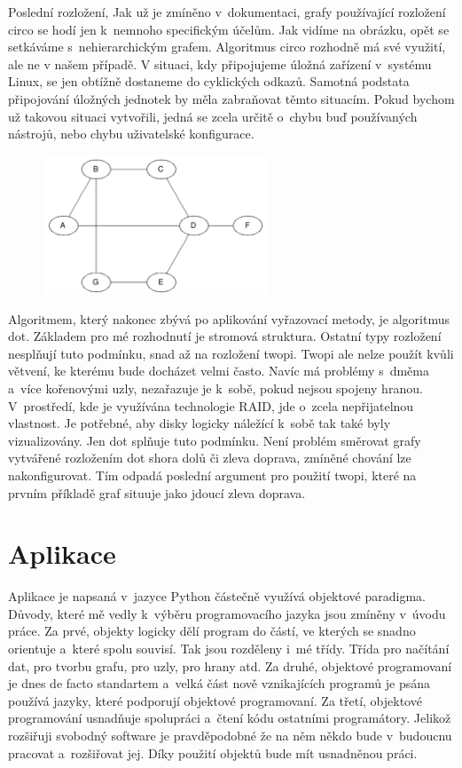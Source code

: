 \documentclass[color,table,oneside,nolot,nolof]{fithesis}
\begin{document}
	Poslední rozložení, \cite{graphviz_layout} 
	Jak už je zmíněno v~dokumentaci, grafy používající rozložení 
	circo se hodí jen k~nemnoho specifickým účelům. Jak vidíme na obrázku, opět se setkáváme s~nehierarchickým grafem. Algoritmus circo rozhodně má své využití, ale ne v našem případě. V
	situaci, kdy připojujeme úložná zařízení v~systému Linux, se jen obtížně dostaneme do cyklických odkazů. Samotná podstata připojování úložných jednotek by měla zabraňovat těmto
	situacím. Pokud bychom už takovou situaci vytvořili, jedná se zcela určitě o~chybu buď používaných nástrojů, nebo chybu uživatelské konfigurace. 
\begin{figure}
	\centering
	\includegraphics[width=0.6\textwidth]{pictures/circo_example.png} 
\end{figure}

	Algoritmem, který nakonec zbývá po aplikování vyřazovací metody, je algoritmus dot. 
	Základem pro mé rozhodnutí je stromová struktura. Ostatní typy rozložení nesplňují tuto podmínku, snad až na rozložení twopi. Twopi ale nelze použít kvůli větvení,
	ke kterému bude docházet velmi často. Navíc má problémy s~dměma a~více kořenovými uzly, nezařazuje je k~sobě, pokud nejsou spojeny hranou. V~prostředí, kde je využívána technologie
	RAID, jde o~zcela nepřijatelnou vlastnost. Je potřebné, aby disky logicky náležící k~sobě tak také byly vizualizovány. Jen dot splňuje tuto podmínku. Není problém směrovat grafy 
	vytvářené rozložením dot shora dolů či zleva doprava, zmíněné chování lze nakonfigurovat. Tím odpadá poslední argument pro použití twopi, které na prvním příkladě graf situuje jako
	jdoucí zleva doprava.

\chapter{Aplikace}
	Aplikace je napsaná v~jazyce Python částečně využívá objektové paradigma. Důvody, které mě vedly k~výběru programovacího jazyka jsou zmíněny v~úvodu práce. Za prvé, objekty logicky
	dělí program do částí, ve kterých se snadno orientuje a~které spolu souvisí. Tak jsou rozděleny i~mé třídy. Třída pro načítání dat, pro tvorbu grafu, pro uzly, pro hrany atd.
	Za druhé, objektové programovaní je dnes de facto standartem a~velká část nově vznikajících programů je psána používá jazyky, které podporují objektové programovaní. Za třetí,
	objektové programování usnadňuje spolupráci a~čtení kódu ostatními programátory. Jelikož rozšiřuji svobodný software je pravděpodobné že na něm někdo bude v~budoucnu pracovat
	a~rozšiřovat jej. Díky použití objektů bude mít usnadněnou práci.
	
\end{document}
